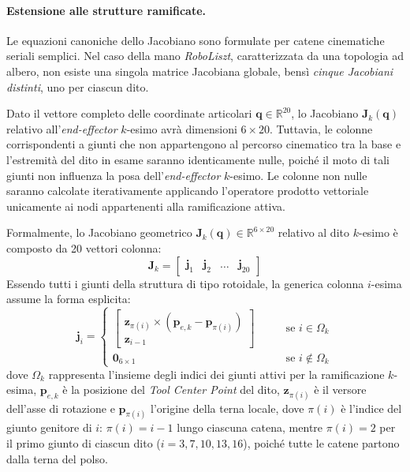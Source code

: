 \paragraph{Estensione alle strutture ramificate.}

Le equazioni canoniche dello Jacobiano sono formulate per catene cinematiche seriali semplici. 
Nel caso della mano \textit{RoboLiszt}, caratterizzata da una topologia ad albero, non esiste una singola matrice Jacobiana globale, bensì \emph{cinque Jacobiani distinti}, uno per ciascun dito. 

Dato il vettore completo delle coordinate articolari $\boldsymbol{q} \in \mathbb{R}^{20}$, lo Jacobiano $\boldsymbol{J}_k(\boldsymbol{q})$ relativo all'\textit{end-effector} $k$-esimo avrà dimensioni $6 \times 20$. 
Tuttavia, le colonne corrispondenti a giunti che non appartengono al percorso cinematico tra la base e l'estremità del dito in esame saranno identicamente nulle, poiché il moto di tali giunti non influenza la posa dell'\textit{end-effector} $k$-esimo. 
Le colonne non nulle saranno calcolate iterativamente applicando l'operatore prodotto vettoriale unicamente ai nodi appartenenti alla ramificazione attiva.

Formalmente, lo Jacobiano geometrico $\boldsymbol{J}_k(\boldsymbol{q}) \in \mathbb{R}^{6 \times 20}$ relativo al dito $k$-esimo è composto da 20 vettori colonna:
\[
    \boldsymbol{J}_k = \begin{bmatrix} \boldsymbol{j}_1 & \boldsymbol{j}_2 & \dots & \boldsymbol{j}_{20} \end{bmatrix}
\]
Essendo tutti i giunti della struttura di tipo rotoidale, la generica colonna $i$-esima assume la forma esplicita:
\[
    \boldsymbol{j}_i = 
    \begin{cases} 
        \begin{bmatrix} 
            \boldsymbol{z}_{\pi(i)} \times (\boldsymbol{p}_{e,k} - \boldsymbol{p}_{\pi(i)}) \\
            \boldsymbol{z}_{i-1} 
        \end{bmatrix}
        \quad \quad & \text{se } i \in \Omega_k \\
        \boldsymbol{0}_{6 \times 1} & \text{se } i \notin \Omega_k 
    \end{cases}
\]
dove $\Omega_k$ rappresenta l'insieme degli indici dei giunti attivi per la ramificazione $k$-esima, $\boldsymbol{p}_{e,k}$ è la posizione del \textit{Tool Center Point} del dito, $\boldsymbol{z}_{\pi(i)}$ è il versore dell'asse di rotazione e $\boldsymbol{p}_{\pi(i)}$ l'origine della terna locale, dove $\pi(i)$ è l'indice del giunto genitore di $i$: $\pi(i)=i-1$ lungo ciascuna catena, mentre $\pi(i)=2$ per il primo giunto di ciascun dito ($i=3,7,10,13,16$), poiché tutte le catene partono dalla terna del polso.

